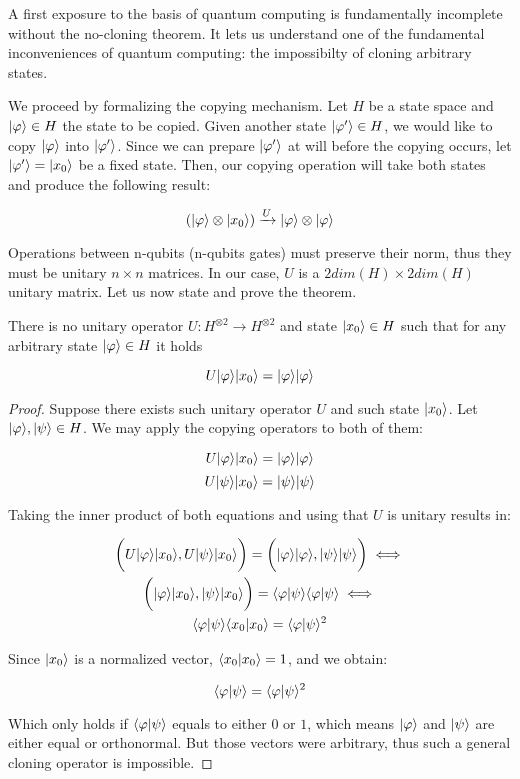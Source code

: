 A first exposure to the basis of quantum computing is fundamentally incomplete without the no-cloning theorem. It lets us understand one of the fundamental inconveniences of quantum computing: the impossibilty of cloning arbitrary states.

We proceed by formalizing the copying mechanism. Let $H$ be a state space and $|\varphi\rangle \in H$ the state to be copied. Given another state $|\varphi'\rangle \in H$, we would like to copy $|\varphi\rangle$ into $|\varphi'\rangle$. Since we can prepare $|\varphi'\rangle$ at will before the copying occurs, let  $|\varphi'\rangle = |x_0\rangle$ be a fixed state. Then, our copying operation will take both states and produce the following result:

$$ (|\varphi\rangle \otimes |x_0\rangle) \xrightarrow{U} |\varphi\rangle \otimes |\varphi\rangle $$

Operations between n-qubits (n-qubits gates) must preserve their norm, thus they must be unitary $n \times n$ matrices. In our case, $U$ is a $2 dim(H) \times 2 dim(H)$ unitary matrix. Let us now state and prove the theorem.

\begin{theorem}
\label{no-cloning-theorem}
	There is no unitary operator $U: H^{\otimes 2} \longrightarrow H^{\otimes 2}$ and state $|x_0\rangle \in H$ such that for any arbitrary state $|\varphi\rangle \in H$ it holds
	
	$$ U |\varphi\rangle |x_0\rangle = |\varphi\rangle |\varphi\rangle $$
\end{theorem}
\begin{proof}
	Suppose there exists such unitary operator $U$ and such state $|x_0\rangle$. Let $|\varphi\rangle, |\psi\rangle \in H$. We may apply the copying operators to both of them:
	
	$$ U |\varphi\rangle |x_0\rangle = |\varphi\rangle |\varphi\rangle $$
	$$ U |\psi\rangle |x_0\rangle = |\psi\rangle |\psi\rangle $$
	
	Taking the inner product of both equations and using that $U$ is unitary results in:
	
	\begin{equation*}
		\begin{gathered}
			\bigg( U |\varphi\rangle |x_0\rangle, U |\psi\rangle |x_0\rangle \bigg) = \bigg( |\varphi\rangle |\varphi\rangle, |\psi\rangle |\psi\rangle \bigg) \iff \\
			\bigg( |\varphi\rangle |x_0\rangle, |\psi\rangle |x_0\rangle \bigg) = \langle\varphi|\psi\rangle \langle\varphi|\psi\rangle \iff \\
			\langle\varphi|\psi\rangle \langle x_0|x_0 \rangle = \langle\varphi|\psi\rangle^2
		\end{gathered}
	\end{equation*}
	
	Since $|x_0\rangle$ is a normalized vector, $\langle x_0|x_0 \rangle = 1$, and we obtain:
	
	$$\langle\varphi|\psi\rangle = \langle\varphi|\psi\rangle^2$$
	
	Which only holds if $\langle\varphi|\psi\rangle$ equals to either $0$ or $1$, which means $|\varphi\rangle$ and $|\psi\rangle$ are either equal or orthonormal. But those vectors were arbitrary, thus such a general cloning operator is impossible. 
\end{proof}
